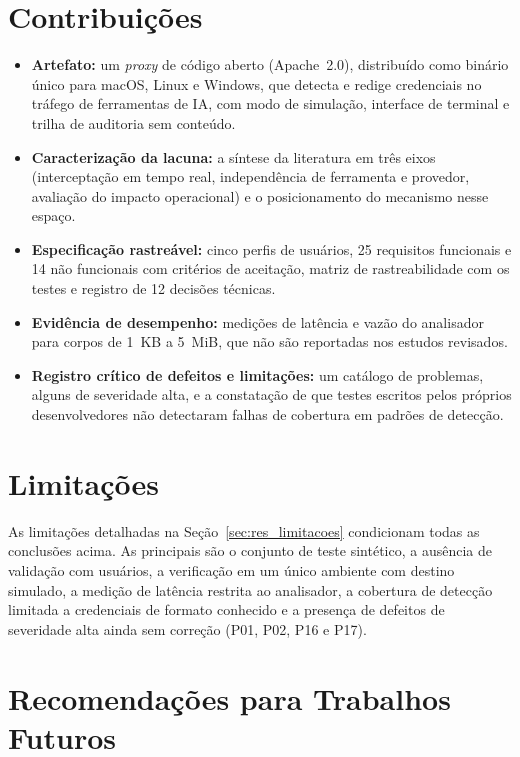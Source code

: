 \section{Contribuições}

\begin{itemize}
    \item \textbf{Artefato:} um \textit{proxy} de código aberto (Apache~2.0), distribuído como binário único para macOS, Linux e Windows, que detecta e redige credenciais no tráfego de ferramentas de IA, com modo de simulação, interface de terminal e trilha de auditoria sem conteúdo.
    \item \textbf{Caracterização da lacuna:} a síntese da literatura em três eixos (interceptação em tempo real, independência de ferramenta e provedor, avaliação do impacto operacional) e o posicionamento do mecanismo nesse espaço.
    \item \textbf{Especificação rastreável:} cinco perfis de usuários, 25 requisitos funcionais e 14 não funcionais com critérios de aceitação, matriz de rastreabilidade com os testes e registro de 12 decisões técnicas.
    \item \textbf{Evidência de desempenho:} medições de latência e vazão do analisador para corpos de 1~KB a 5~MiB, que não são reportadas nos estudos revisados.
    \item \textbf{Registro crítico de defeitos e limitações:} um catálogo de problemas, alguns de severidade alta, e a constatação de que testes escritos pelos próprios desenvolvedores não detectaram falhas de cobertura em padrões de detecção.
\end{itemize}

\section{Limitações}

As limitações detalhadas na Seção~\ref{sec:res_limitacoes} condicionam todas as conclusões acima. As principais são o conjunto de teste sintético, a ausência de validação com usuários, a verificação em um único ambiente com destino simulado, a medição de latência restrita ao analisador, a cobertura de detecção limitada a credenciais de formato conhecido e a presença de defeitos de severidade alta ainda sem correção (P01, P02, P16 e P17).

\section{Recomendações para Trabalhos Futuros}
\label{sec:conc_futuros}

